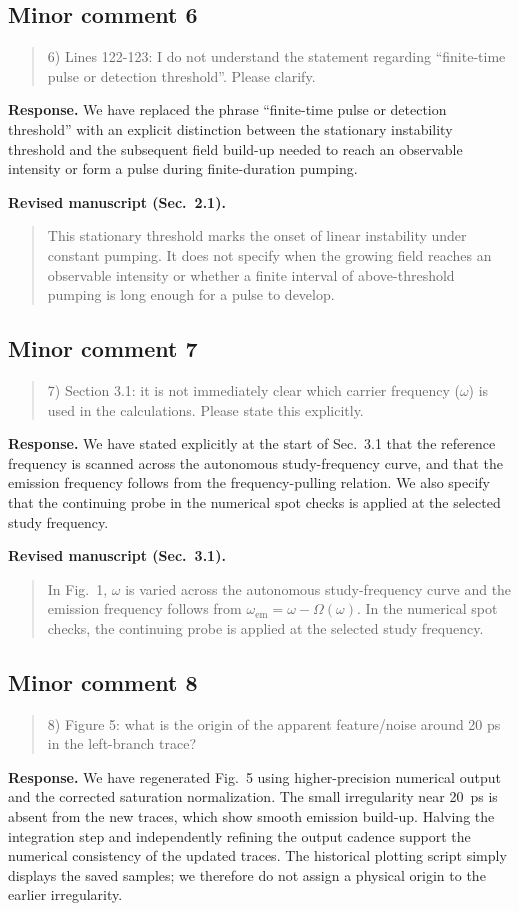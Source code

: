 \documentclass[11pt,a4paper]{article}
\newif\ifshowrevisions
\newcommand{\minorrevised}[1]{{\ifshowrevisions\color{revisiongreen}\fi #1}}
\newcommand{\reviewercomment}[1]{\begin{quote}\small #1\end{quote}}
\newcommand{\response}[1]{\par\textbf{Response.} #1\par}
\newcommand{\minormanuscripttext}[2]{\par\textbf{Revised manuscript (#1).}\begin{quote}\minorrevised{#2}\end{quote}}
\begin{document}
\subsection*{Minor comment 6}
\label{r1-minor-6}
\reviewercomment{
6) Lines 122-123: I do not understand the statement regarding “finite-time pulse or detection threshold”. Please clarify.
}
\response{We have replaced the phrase ``finite-time pulse or detection threshold'' with an explicit distinction between the stationary instability threshold and the subsequent field build-up needed to reach an observable intensity or form a pulse during finite-duration pumping.}
\minormanuscripttext{Sec.~2.1}{This stationary threshold marks the onset of linear instability under constant pumping. It does not specify when the growing field reaches an observable intensity or whether a finite interval of above-threshold pumping is long enough for a pulse to develop.}


\subsection*{Minor comment 7}
\label{r1-minor-7}
\reviewercomment{
7) Section 3.1: it is not immediately clear which carrier frequency ($\omega$) is used in the calculations. Please state this explicitly.
}
\response{We have stated explicitly at the start of Sec.~3.1 that the reference frequency is scanned across the autonomous study-frequency curve, and that the emission frequency follows from the frequency-pulling relation. We also specify that the continuing probe in the numerical spot checks is applied at the selected study frequency.}
\minormanuscripttext{Sec.~3.1}{In Fig.~1, $\omega$ is varied across the autonomous study-frequency curve and the emission frequency follows from $\omega_{\mathrm{em}}=\omega-\Omega(\omega)$. In the numerical spot checks, the continuing probe is applied at the selected study frequency.}


\subsection*{Minor comment 8}
\label{r1-minor-8}
\reviewercomment{
8) Figure 5: what is the origin of the apparent feature/noise around 20 ps in the left-branch trace?
}
\response{We have regenerated Fig.~5 using higher-precision numerical output and the corrected saturation normalization. The small irregularity near 20~ps is absent from the new traces, which show smooth emission build-up. Halving the integration step and independently refining the output cadence support the numerical consistency of the updated traces. The historical plotting script simply displays the saved samples; we therefore do not assign a physical origin to the earlier irregularity.}
\end{document}
